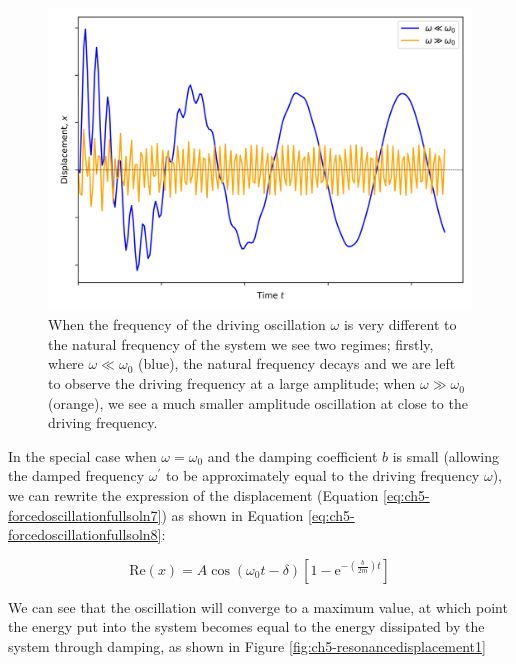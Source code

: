\documentclass[
]{book}
\begin{document}
\begin{figure}

{\centering \includegraphics[width=0.7\linewidth]{visualisations/ch5-forcedosc4} 

}

\caption{When the frequency of the driving oscillation $\omega$ is very different to the natural frequency of the system we see two regimes; firstly, where $\omega \ll \omega_0$ (blue), the natural frequency decays and we are left to observe the driving frequency at a large amplitude; when $\omega \gg \omega_0$ (orange), we see a much smaller amplitude oscillation at close to the driving frequency.}\label{fig:ch5-forcedosc4}
\end{figure}

In the special case when \(\omega = \omega_0\) and the damping coefficient \(b\) is small (allowing the damped frequency \(\omega^\prime\) to be approximately equal to the driving frequency \(\omega\)), we can rewrite the expression of the displacement (Equation \eqref{eq:ch5-forcedoscillationfullsoln7}) as shown in Equation \eqref{eq:ch5-forcedoscillationfullsoln8}:

\begin{equation}
\mathrm{Re}(x) = A  \cos (\omega_0 t - \delta) \left[ 1 - \mathrm{e}^{- \left(\frac{b}{2m}\right)t}  \right]
\label{eq:ch5-forcedoscillationfullsoln8}
\end{equation}

We can see that the oscillation will converge to a maximum value, at which point the energy put into the system becomes equal to the energy dissipated by the system through damping, as shown in Figure \ref{fig:ch5-resonancedisplacement1}
\end{document}
